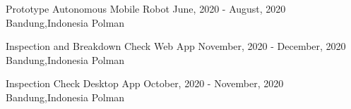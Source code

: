 \begin{cvhonors}
  \cvhonor
    {Prototype Autonomous Mobile Robot} %
    {June, 2020 - August, 2020} %
    {Bandung,Indonesia} %
    {Polman} %

  \cvhonor
    {Inspection and Breakdown Check Web App} %
    {November, 2020 - December, 2020} %
    {Bandung,Indonesia} %
    {Polman} %

  \cvhonor
    {Inspection Check Desktop App} %
    {October, 2020 - November, 2020} %
    {Bandung,Indonesia} %
    {Polman} %

\end{cvhonors}